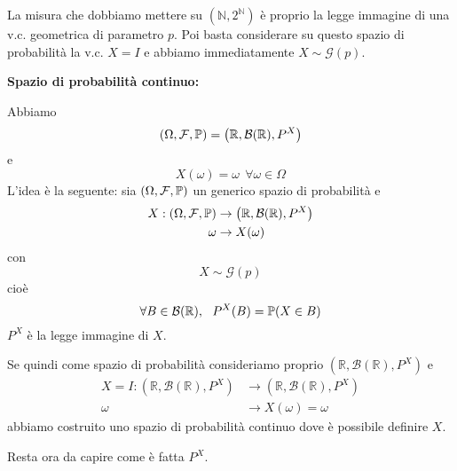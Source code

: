 \begin{enumerate}
\begin{oss}
La misura che dobbiamo mettere su $\left(\mathbb{N} ,2^{\mathbb{N}}\right)$ è proprio la legge immagine di una v.c. geometrica di parametro $p$. Poi basta considerare su questo spazio di probabilità la v.c. $X=I$ e abbiamo immediatamente $X\sim \mathcal{G}( p)$.
\end{oss}

\textbf{Spazio di probabilità continuo:}

Abbiamo
\begin{equation*}
( \Omega ,\mathcal{F} ,\mathbb{P}) =\left(\mathbb{R} ,\mathcal{B}(\mathbb{R}) ,P^{X}\right)
\end{equation*}
e
\begin{equation*}
X( \omega ) =\omega \ \ \forall \omega \in \Omega 
\end{equation*}
L'idea è la seguente: sia $( \Omega ,\mathcal{F} ,\mathbb{P})$ un generico spazio di probabilità e
\begin{align*}
X:( \Omega ,\mathcal{F} ,\mathbb{P}) & \rightarrow \left(\mathbb{R} ,\mathcal{B}(\mathbb{R}) ,P^{X}\right)\\
\omega  & \rightarrow X( \omega )
\end{align*}
con
\begin{equation*}
X\sim \mathcal{G}( p)
\end{equation*}
cioè
\begin{equation*}
\forall B\in \mathcal{B}(\mathbb{R}) ,\ \ P^{X}( B) =\mathbb{P}( X\in B)
\end{equation*}
$P^{X}$ è la legge immagine di $X$.

Se quindi come spazio di probabilità consideriamo proprio $\left(\mathbb{R} ,\mathcal{B}(\mathbb{R}) ,P^{X}\right)$ e
\begin{align*}
X=I:\left(\mathbb{R} ,\mathcal{B}(\mathbb{R}) ,P^{X}\right) & \rightarrow \left(\mathbb{R} ,\mathcal{B}(\mathbb{R}) ,P^{X}\right)\\
\omega  & \rightarrow X( \omega ) =\omega 
\end{align*}
abbiamo costruito uno spazio di probabilità continuo dove è possibile definire $X$.

Resta ora da capire come è fatta $P^{X}$.
\end{enumerate}
